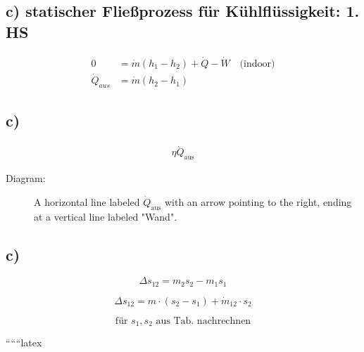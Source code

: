\subsection*{c) statischer Fließprozess für Kühlflüssigkeit: 1. HS}

\begin{align*}
    0 &= \dot{m} (h_1 - h_2) + \dot{Q} - \dot{W} \quad \text{(indoor)} \\
    \dot{Q}_{aus} &= \dot{m} (h_2 - h_1)
\end{align*}



\subsection*{c)}
\begin{align*}
    \eta \dot{Q}_{\text{aus}}
\end{align*}

\begin{description}
    \item[Diagram:] A horizontal line labeled $\dot{Q}_{\text{aus}}$ with an arrow pointing to the right, ending at a vertical line labeled "Wand".
\end{description}



\subsection*{c)}
\[
\Delta s_{12} = m_2 s_2 - m_1 s_1
\]

\[
\Delta s_{12} = m \cdot (s_2 - s_1) + \dot{m}_{12} \cdot s_2
\]

\[
\text{für } s_1, s_2 \text{ aus Tab. nachrechnen}
\]

``````latex